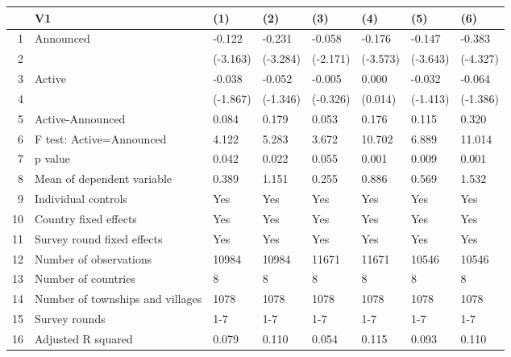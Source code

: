 \begin{table}[ht]
\centering
\begin{tabular}{rlllllll}
  \hline
 & V1 & (1) & (2) & (3) & (4) & (5) & (6) \\ 
  \hline
1 & Announced & -0.122 & -0.231 & -0.058 & -0.176 & -0.147 & -0.383 \\ 
  2 &  & (-3.163) & (-3.284) & (-2.171) & (-3.573) & (-3.643) & (-4.327) \\ 
  3 & Active & -0.038 & -0.052 & -0.005 & 0.000 & -0.032 & -0.064 \\ 
  4 &  & (-1.867) & (-1.346) & (-0.326) & (0.014) & (-1.413) & (-1.386) \\ 
  5 & Active-Announced & 0.084 & 0.179 & 0.053 & 0.176 & 0.115 & 0.320 \\ 
  6 & F test: Active=Announced & 4.122 & 5.283 & 3.672 & 10.702 & 6.889 & 11.014 \\ 
  7 & p value & 0.042 & 0.022 & 0.055 & 0.001 & 0.009 & 0.001 \\ 
  8 & Mean of dependent variable & 0.389 & 1.151 & 0.255 & 0.886 & 0.569 & 1.532 \\ 
  9 & Individual controls & Yes & Yes & Yes & Yes & Yes & Yes \\ 
  10 & Country fixed effects & Yes & Yes & Yes & Yes & Yes & Yes \\ 
  11 & Survey round fixed effects & Yes & Yes & Yes & Yes & Yes & Yes \\ 
  12 & Number of observations & 10984 & 10984 & 11671 & 11671 & 10546 & 10546 \\ 
  13 & Number of countries & 8 & 8 & 8 & 8 & 8 & 8 \\ 
  14 & Number of townships and villages & 1078 & 1078 & 1078 & 1078 & 1078 & 1078 \\ 
  15 & Survey rounds & 1-7 & 1-7 & 1-7 & 1-7 & 1-7 & 1-7 \\ 
  16 & Adjusted R squared & 0.079 & 0.110 & 0.054 & 0.115 & 0.093 & 0.110 \\ 
   \hline
\end{tabular}
\end{table}
